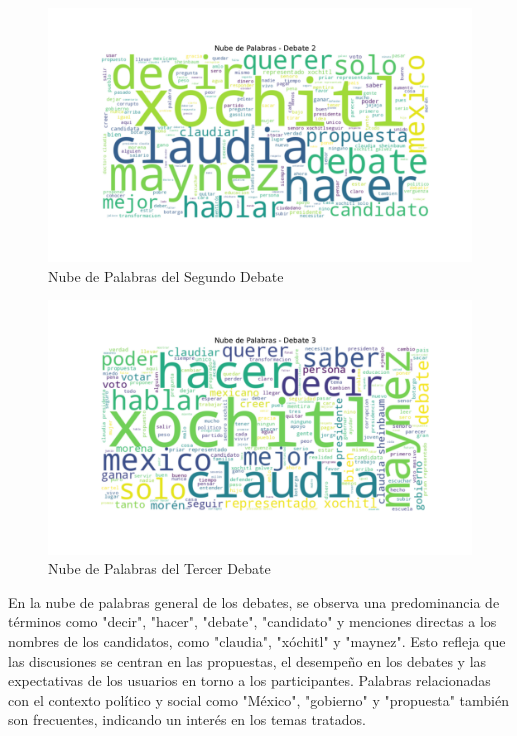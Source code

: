 \documentclass[10pt, a4paper]{article}
\begin{document}
	\newpage
	
	\vspace{-4mm}
	\begin{figure}[h!]
		\centering
		\includegraphics[width=1\textwidth]{nube_palabras_debate_2.pdf} %
		\vspace{-22mm}
		\caption{Nube de Palabras del Segundo Debate}
		\label{fig:nubeDebate2} %
	\end{figure}
	
	\vspace{-10mm}
	\begin{figure}[h!]
		\centering
		\includegraphics[width=1\textwidth]{nube_palabras_debate_3.pdf} %
		\vspace{-22mm}
		\caption{Nube de Palabras del Tercer Debate}
		\label{fig:nubeDebate3} %
	\end{figure}
	
	En la nube de palabras general de los debates, se observa una predominancia de términos como "decir", "hacer", "debate", "candidato" y menciones directas a los nombres de los candidatos, como "claudia", "xóchitl" y "maynez". Esto refleja que las discusiones se centran en las propuestas, el desempeño en los debates y las expectativas de los usuarios en torno a los participantes. Palabras relacionadas con el contexto político y social como "México", "gobierno" y "propuesta" también son frecuentes, indicando un interés en los temas tratados.
	
\end{document}
